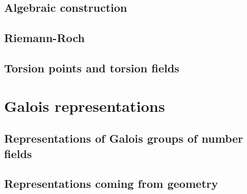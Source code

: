 \documentclass{dcthesis}
\theoremstyle{definition}
\theoremstyle{remark}
\begin{document}
{{    \subsection{Algebraic construction}{
      \lipsum[1]
    }
    \subsection{Riemann-Roch}{
      \lipsum[1]
    }
    \subsection{Torsion points and torsion fields}{
      \lipsum[1]
    }
  }
  \section{Galois representations}{
    \lipsum[1]
    \subsection{Representations of Galois groups of number fields}{
      \lipsum[1]
    }
    \subsection{Representations coming from geometry}{
      \lipsum[1]
    }
  }
}
\end{document}
